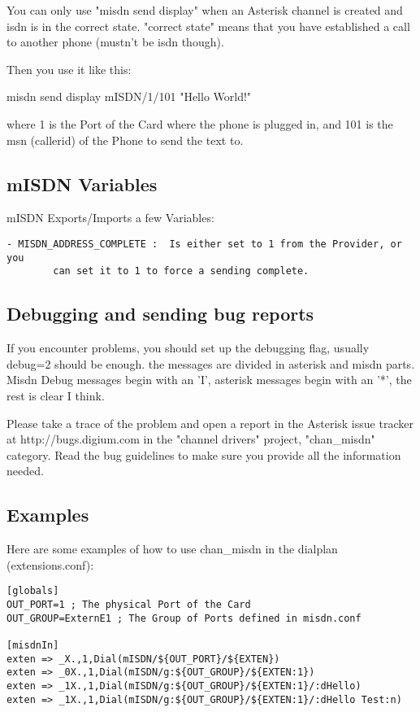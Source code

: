 You can only use "misdn send display" when an Asterisk channel is created and
isdn is in the correct state. "correct state" means that you have established a
call to another phone (mustn't be isdn though).

Then you use it like this:

misdn send display mISDN/1/101 "Hello World!"

where 1 is the Port of the Card where the phone is plugged in, and 101 is the
msn (callerid) of the Phone to send the text to.

\subsection{mISDN Variables}

mISDN Exports/Imports a few Variables: 

\begin{verbatim}
- MISDN_ADDRESS_COMPLETE :  Is either set to 1 from the Provider, or you 
        can set it to 1 to force a sending complete.
\end{verbatim}


\subsection{Debugging and sending bug reports}

If you encounter problems, you should set up the debugging flag, usually
debug=2 should be enough. the messages are divided in asterisk and misdn
parts.  Misdn Debug messages begin with an 'I', asterisk messages begin with
an '*', the rest is clear I think.

Please take a trace of the problem and open a report in the Asterisk issue
tracker at http://bugs.digium.com in the "channel drivers" project,
"chan\_misdn" category. Read the bug guidelines to make sure you
provide all the information needed.


\subsection{Examples}

Here are some examples of how to use chan\_misdn in the dialplan
(extensions.conf):

\begin{verbatim}
[globals]
OUT_PORT=1 ; The physical Port of the Card
OUT_GROUP=ExternE1 ; The Group of Ports defined in misdn.conf

[misdnIn]
exten => _X.,1,Dial(mISDN/${OUT_PORT}/${EXTEN})
exten => _0X.,1,Dial(mISDN/g:${OUT_GROUP}/${EXTEN:1})
exten => _1X.,1,Dial(mISDN/g:${OUT_GROUP}/${EXTEN:1}/:dHello)
exten => _1X.,1,Dial(mISDN/g:${OUT_GROUP}/${EXTEN:1}/:dHello Test:n)
\end{verbatim}

